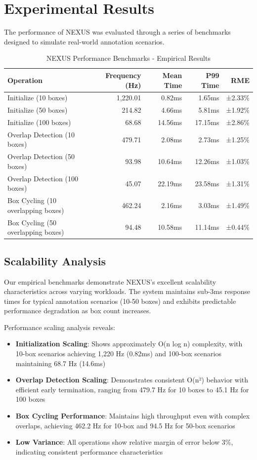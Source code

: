 \documentclass[10pt]{article}
\begin{document}
\section{Experimental Results}
The performance of NEXUS was evaluated through a series of benchmarks designed to simulate real-world annotation scenarios.

\begin{table}[H]
\caption{NEXUS Performance Benchmarks - Empirical Results}
\label{tab:benchmarks}
\begin{center}
\begin{tabular}{lrrrr}
\toprule
Operation & Frequency (Hz) & Mean Time & P99 Time & RME \\
\midrule
Initialize (10 boxes) & 1,220.01 & 0.82ms & 1.65ms & ±2.33\% \\
Initialize (50 boxes) & 214.82 & 4.66ms & 5.81ms & ±1.92\% \\
Initialize (100 boxes) & 68.68 & 14.56ms & 17.15ms & ±2.86\% \\
\midrule
Overlap Detection (10 boxes) & 479.71 & 2.08ms & 2.73ms & ±1.25\% \\
Overlap Detection (50 boxes) & 93.98 & 10.64ms & 12.26ms & ±1.03\% \\
Overlap Detection (100 boxes) & 45.07 & 22.19ms & 23.58ms & ±1.31\% \\
\midrule
Box Cycling (10 overlapping boxes) & 462.24 & 2.16ms & 3.03ms & ±1.49\% \\
Box Cycling (50 overlapping boxes) & 94.48 & 10.58ms & 11.14ms & ±0.44\% \\
\bottomrule
\end{tabular}
\end{center}
\end{table}

\subsection{Scalability Analysis}
Our empirical benchmarks demonstrate NEXUS's excellent scalability characteristics across varying workloads. The system maintains sub-3ms response times for typical annotation scenarios (10-50 boxes) and exhibits predictable performance degradation as box count increases.

Performance scaling analysis reveals:
\begin{itemize}
    \item \textbf{Initialization Scaling}: Shows approximately O(n log n) complexity, with 10-box scenarios achieving 1,220 Hz (0.82ms) and 100-box scenarios maintaining 68.7 Hz (14.6ms)
    \item \textbf{Overlap Detection Scaling}: Demonstrates consistent O(n²) behavior with efficient early termination, ranging from 479.7 Hz for 10 boxes to 45.1 Hz for 100 boxes
    \item \textbf{Box Cycling Performance}: Maintains high throughput even with complex overlaps, achieving 462.2 Hz for 10-box and 94.5 Hz for 50-box scenarios
    \item \textbf{Low Variance}: All operations show relative margin of error below 3\%, indicating consistent performance characteristics
\end{itemize}
\end{document}

